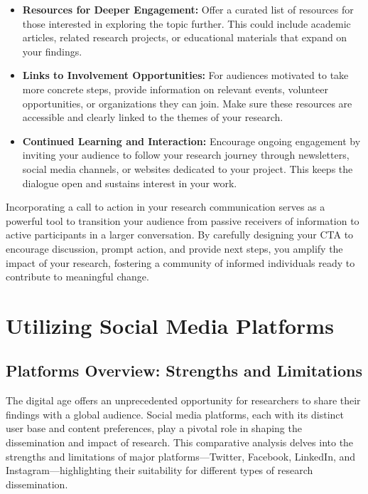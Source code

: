 \documentclass[
]{book}
\begin{document}
\begin{itemize}
\item
  \textbf{Resources for Deeper Engagement:} Offer a curated list of resources for those interested in exploring the topic further. This could include academic articles, related research projects, or educational materials that expand on your findings.
\item
  \textbf{Links to Involvement Opportunities:} For audiences motivated to take more concrete steps, provide information on relevant events, volunteer opportunities, or organizations they can join. Make sure these resources are accessible and clearly linked to the themes of your research.
\item
  \textbf{Continued Learning and Interaction:} Encourage ongoing engagement by inviting your audience to follow your research journey through newsletters, social media channels, or websites dedicated to your project. This keeps the dialogue open and sustains interest in your work.
\end{itemize}

Incorporating a call to action in your research communication serves as a powerful tool to transition your audience from passive receivers of information to active participants in a larger conversation. By carefully designing your CTA to encourage discussion, prompt action, and provide next steps, you amplify the impact of your research, fostering a community of informed individuals ready to contribute to meaningful change.

\hypertarget{utilizing-social-media-platforms}{%
\section{Utilizing Social Media Platforms}\label{utilizing-social-media-platforms}}

\hypertarget{platforms-overview-strengths-and-limitations}{%
\subsection*{Platforms Overview: Strengths and Limitations}\label{platforms-overview-strengths-and-limitations}}

The digital age offers an unprecedented opportunity for researchers to share their findings with a global audience. Social media platforms, each with its distinct user base and content preferences, play a pivotal role in shaping the dissemination and impact of research. This comparative analysis delves into the strengths and limitations of major platforms---Twitter, Facebook, LinkedIn, and Instagram---highlighting their suitability for different types of research dissemination.
\end{document}
